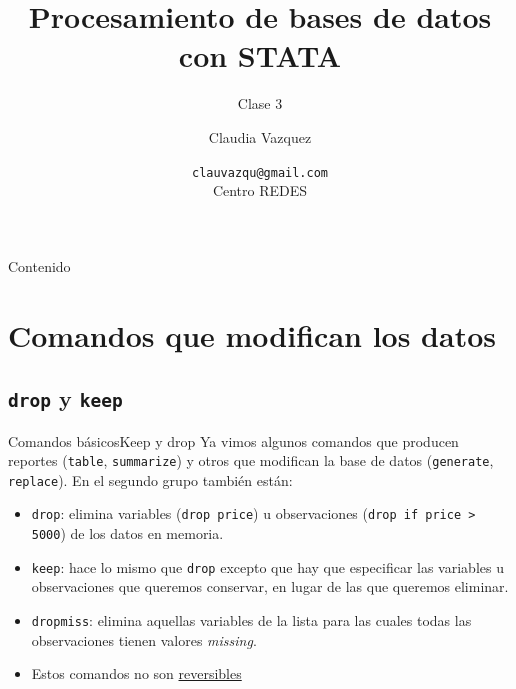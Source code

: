 \documentclass{beamer}
\title[Clase 3]{Procesamiento de bases de datos con STATA}
\subtitle{Clase 3}
\author{Claudia Vazquez}
\date[]{\texttt{clauvazqu@gmail.com}\\Centro REDES}
\begin{document}
\begin{frame}
  \titlepage
\end{frame}

\begin{frame}{Contenido}
  \tableofcontents
 \end{frame}

\section{Comandos que modifican los datos}

\subsection{\texttt{drop} y \texttt{keep}}

\begin{frame}{Comandos básicos}{Keep y drop}
Ya vimos algunos comandos que producen reportes (\texttt{table}, \texttt{summarize}) y otros que modifican la base de datos (\texttt{generate}, \texttt{replace}). En el segundo grupo también están:
\begin{itemize}
\item \texttt{drop}: elimina variables (\texttt{drop price}) u observaciones (\texttt{drop if price > 5000}) de los datos en memoria.
\item \texttt{keep}: hace lo mismo que  \texttt{drop} excepto que hay que especificar las variables u observaciones que queremos conservar, en lugar de las que queremos eliminar.
\item \texttt{dropmiss}: elimina aquellas variables de la lista para las cuales todas las observaciones tienen valores \textit{missing}.
\item Estos comandos no son \underline{reversibles}
\end{itemize}
\end{frame}
\end{document}
